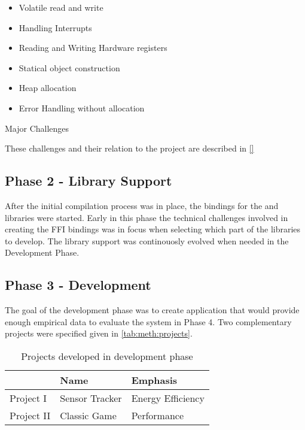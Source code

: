 \begin{listing}[H]
  \begin{itemize}
    \item Volatile read and write
    \item Handling Interrupts
    \item Reading and Writing Hardware registers
    \item Statical object construction
    \item Heap allocation
    \item Error Handling without allocation
  \end{itemize}
  \caption{Major Challenges}
  \label{fig:meth:challenges}
\end{listing}

These challenges and their relation to the project are described in \autoref{} 

\subsection{Phase 2 - Library Support}

After the initial compilation process was in place, the bindings for the  and {\emlib} libraries were started.
Early in this phase the technical challenges involved in creating the FFI bindings was in focus when selecting which part of the libraries to develop.
The library support was continouosly evolved when needed in the Development Phase.

\subsection{Phase 3 - Development}
\label{sec:projects}

The goal of the development phase was to create application that would provide enough empirical data to evaluate the system in Phase 4.
Two complementary projects were specified given in \autoref{tab:meth:projects}.

\begin{table}[H]
  \centering
  \begin{tabular}{l|l|l}
    & \textbf{Name} & \textbf{Emphasis} \\
    \hline
    Project I & Sensor Tracker & Energy Efficiency \\
    Project II & Classic Game & Performance \\
    \hline
  \end{tabular}
  \caption{Projects developed in development phase}
  \label{tab:meth:projects}
\end{table}

